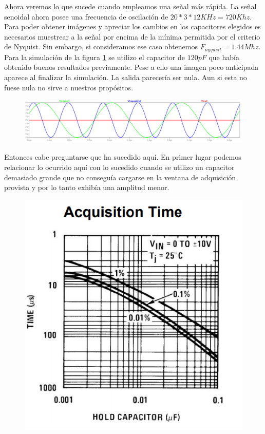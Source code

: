 Ahora veremos lo que sucede cuando empleamos una señal más rápida.
La señal senoidal ahora posee una frecuencia de oscilación de $20*3*12 KHz = 720Khz$. Para poder obtener imágenes y apreciar los cambios en los capacitores elegidos es necesarios muestrear a la señal por encima de la mínima permitida por el criterio de Nyquist. Sin embargo, si consideramos ese caso obtenemos  $F_{nyqusit}=1.44Mhz$.
Para la simulación de la  figura \ref{fig:vin21440ksamplign120pf} se utilizo el capacitor de $120pF$ que había obtenido buenos resultados previamente. Pese a ello una imagen poco anticipada aparece al finalizar la simulación. La salida parecería ser nula. Aun si esta no fuese nula no sirve a nuestros propósitos. 
\begin{figure}[H]
	\centering
	\includegraphics[width=\linewidth]{ImagenesEjercicio4/ChTests/Vin2_1440kSamplign120pF}
	\caption{}
	\label{fig:vin21440ksamplign120pf}
\end{figure}

Entonces cabe preguntarse que ha sucedido aquí. 
En primer lugar podemos relacionar lo ocurrido aquí con lo sucedido cuando se utilizo un capacitor demasiado grande que no conseguía cargarse en la ventana de adquisición provista y por lo tanto exhibía una amplitud menor.

\begin{figure}[H]
	\centering
	\includegraphics[scale=0.6]{ImagenesEjercicio4/HoldCapAcqTime}
	\caption{}
	\label{fig:holdcapacqtime}
\end{figure}

